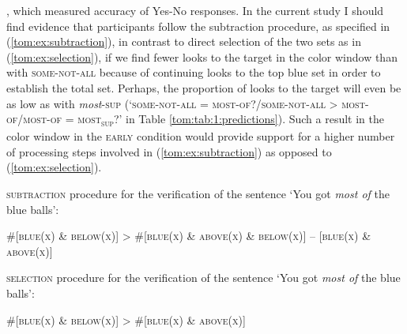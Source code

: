 \documentclass[output=paper]{langscibook}
\begin{document}
\citet{pietroski2009meaning,lidz2011interface,tomaszewicz2011verification,tomaszewicz2012semantics,tomaszewicz2013linguistic,hunter2017verification, Knowlton2021}, which measured accuracy of Yes-No responses. In the current study I should find
evidence that participants follow the subtraction procedure, as specified in (\ref{tom:ex:subtraction}), in contrast to direct selection of
the two sets as in (\ref{tom:ex:selection}), if we find fewer looks to the target in the color window than with \textsc{some-not-all}
because of continuing looks to the top blue set in order to establish the total set. Perhaps, the proportion of looks
to the target will even be as low as with \textit{most}\textsc{-sup}\textit{ }(`\textsc{some-not-all} = \textsc{most-of}?\slash \textsc{some-not-all} {\textgreater} \textsc{most-of}\slash \textsc{most-of} = \textsc{most\textsubscript{sup}}?' in Table \ref{tom:tab:1:predictions}). Such a result in the color window in the \textsc{early} condition would provide
support for a higher number of processing steps involved in (\ref{tom:ex:subtraction}) as opposed to (\ref{tom:ex:selection}). 


\ea \textsc{subtraction} procedure for the verification of the sentence `You got \textit{most of }the blue balls':

\#[\textsc{blue(x)} \& \textsc{below(x)}] {\textgreater} \#[\textsc{blue(x)} \& \textsc{above(x)} \& \textsc{below(x)}] – [\textsc{blue(x)} \& \textsc{above(x)}]\\
\label{tom:ex:subtraction}


\ex \textsc{selection} procedure for the verification of the sentence `You got \textit{most of }the blue balls':

\#[\textsc{blue(x)} \& \textsc{below(x)}] {\textgreater} \#[\textsc{blue(x)} \& \textsc{above(x)}]
\label{tom:ex:selection}
\z

  
\end{document}
